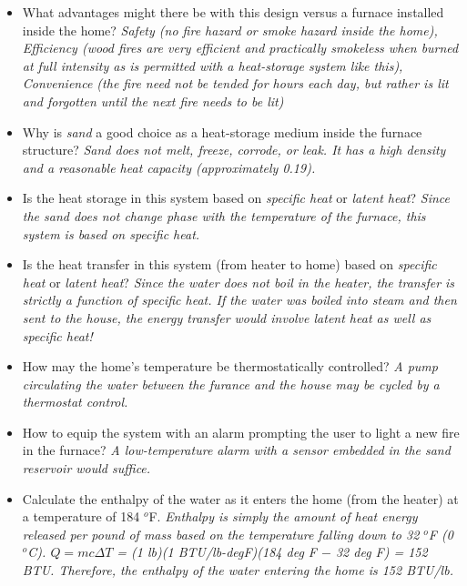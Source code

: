 





\begin{itemize}
\item{} What advantages might there be with this design versus a furnace installed inside the home? {\it Safety (no fire hazard or smoke hazard inside the home), Efficiency (wood fires are very efficient and practically smokeless when burned at full intensity as is permitted with a heat-storage system like this), Convenience (the fire need not be tended for hours each day, but rather is lit and forgotten until the next fire needs to be lit)}
\vskip 5pt
\item{} Why is {\it sand} a good choice as a heat-storage medium inside the furnace structure? {\it Sand does not melt, freeze, corrode, or leak.  It has a high density and a reasonable heat capacity (approximately 0.19).}
\vskip 5pt
\item{} Is the heat storage in this system based on {\it specific heat} or {\it latent heat}?  {\it Since the sand does not change phase with the temperature of the furnace, this system is based on specific heat.}
\vskip 5pt
\item{} Is the heat transfer in this system (from heater to home) based on {\it specific heat} or {\it latent heat}? {\it Since the water does not boil in the heater, the transfer is strictly a function of specific heat.  If the water was boiled into steam and then sent to the house, the energy transfer would involve latent heat as well as specific heat!} 
\vskip 5pt
\item{} How may the home's temperature be thermostatically controlled? {\it A pump circulating the water between the furance and the house may be cycled by a thermostat control.}
\vskip 5pt
\item{} How to equip the system with an alarm prompting the user to light a new fire in the furnace? {\it A low-temperature alarm with a sensor embedded in the sand reservoir would suffice.}
\vskip 5pt
\item{} Calculate the enthalpy of the water as it enters the home (from the heater) at a temperature of 184 $^{o}$F.  {\it Enthalpy is simply the amount of heat energy released per pound of mass based on the temperature falling down to 32 $^{o}$F (0 $^{o}$C).  $Q = mc \Delta T$ = (1 lb)(1 BTU/lb-degF)(184 deg F $-$ 32 deg F) = 152 BTU.  Therefore, the enthalpy of the water entering the home is 152 BTU/lb.}

\end{itemize}
